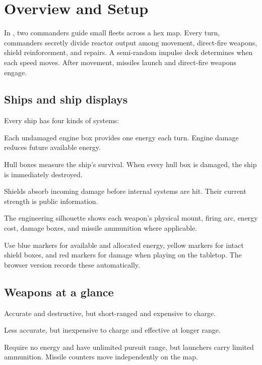 \chapter{Overview and Setup}

In \game{}, two commanders guide small fleets across a hex map. Every turn, commanders secretly divide reactor output among movement, direct-fire weapons, shield reinforcement, and repairs. A semi-random impulse deck determines when each speed moves. After movement, missiles launch and direct-fire weapons engage.

\section{Ships and ship displays}

Every ship has four kinds of systems:

\begin{description}[style=nextline,leftmargin=0pt]
  \item[Reactor / engines] Each undamaged engine box provides one energy each turn. Engine damage reduces future available energy.
  \item[Hull integrity] Hull boxes measure the ship's survival. When every hull box is damaged, the ship is immediately destroyed.
  \item[Forward and aft shields] Shields absorb incoming damage before internal systems are hit. Their current strength is public information.
  \item[Weapons] The engineering silhouette shows each weapon's physical mount, firing arc, energy cost, damage boxes, and missile ammunition where applicable.
\end{description}

Use blue markers for available and allocated energy, yellow markers for intact shield boxes, and red markers for damage when playing on the tabletop. The browser version records these automatically.

\section{Weapons at a glance}

\begin{description}[style=nextline,leftmargin=0pt]
  \item[Lance beams] Accurate and destructive, but short-ranged and expensive to charge.
  \item[Mass drivers] Less accurate, but inexpensive to charge and effective at longer range.
  \item[Seeker missiles] Require no energy and have unlimited pursuit range, but launchers carry limited ammunition. Missile counters move independently on the map.
\end{description}

